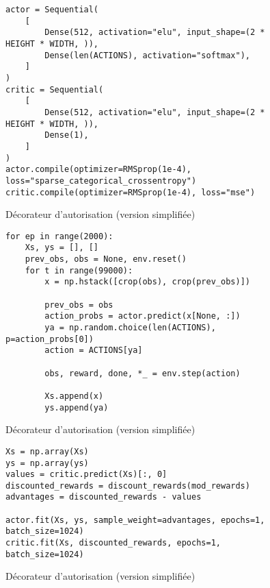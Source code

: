 

\renewcommand{\theFancyVerbLine}{
    \textcolor{mylinenumbercolor}{\ttfamily\arabic{FancyVerbLine}} %
}

\begin{figure}[!ht]
\centering
\begin{verbatim}
actor = Sequential(
    [
        Dense(512, activation="elu", input_shape=(2 * HEIGHT * WIDTH, )),
        Dense(len(ACTIONS), activation="softmax"),
    ]
)
critic = Sequential(
    [
        Dense(512, activation="elu", input_shape=(2 * HEIGHT * WIDTH, )),
        Dense(1),
    ]
)
actor.compile(optimizer=RMSprop(1e-4), loss="sparse_categorical_crossentropy")
critic.compile(optimizer=RMSprop(1e-4), loss="mse")
\end{verbatim}
\caption{Décorateur d'autorisation (version simplifiée)}
\label{fig:decorator}
\end{figure}


\begin{figure}[!ht]
\centering
\begin{verbatim}
for ep in range(2000):
    Xs, ys = [], []
    prev_obs, obs = None, env.reset()
    for t in range(99000):
        x = np.hstack([crop(obs), crop(prev_obs)])

        prev_obs = obs
        action_probs = actor.predict(x[None, :])
        ya = np.random.choice(len(ACTIONS), p=action_probs[0])
        action = ACTIONS[ya]

        obs, reward, done, *_ = env.step(action)

        Xs.append(x)
        ys.append(ya)
\end{verbatim}
\caption{Décorateur d'autorisation (version simplifiée)}
\label{fig:decorator}
\end{figure}

\begin{figure}[!ht]
\centering
\begin{verbatim}
Xs = np.array(Xs)
ys = np.array(ys)
values = critic.predict(Xs)[:, 0]
discounted_rewards = discount_rewards(mod_rewards)
advantages = discounted_rewards - values

actor.fit(Xs, ys, sample_weight=advantages, epochs=1, batch_size=1024)
critic.fit(Xs, discounted_rewards, epochs=1, batch_size=1024)
\end{verbatim}
\caption{Décorateur d'autorisation (version simplifiée)}
\label{fig:decorator}
\end{figure}


